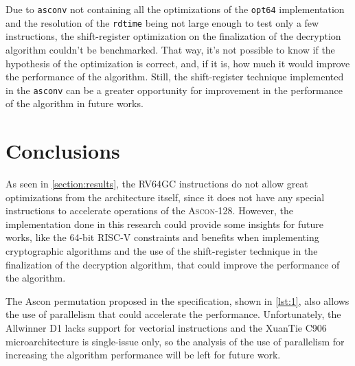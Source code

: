 \documentclass[11pt,twoside]{article}
\begin{document}
Due to \texttt{asconv} not containing all the optimizations of the \texttt{opt64} implementation and the resolution of the \texttt{rdtime} being not large enough to test only a few instructions, the shift-register optimization on the finalization of the decryption algorithm couldn't be benchmarked. That way, it's not possible to know if the hypothesis of the optimization is correct, and, if it is, how much it would improve the performance of the algorithm. Still, the shift-register technique implemented in the \texttt{asconv} can be a greater opportunity for improvement in the performance of the algorithm in future works.

\section{Conclusions}

As seen in \cref{section:results}, the \textsf{RV64GC} instructions do not allow great optimizations from the architecture itself, since it does not have any special instructions to accelerate operations of the \textsc{Ascon-128}. However, the implementation done in this research could provide some insights for future works, like the 64-bit RISC-V constraints and benefits when implementing cryptographic algorithms and the use of the shift-register technique in the finalization of the decryption algorithm, that could improve the performance of the algorithm.

The Ascon permutation proposed in the specification, shown in \cref{lst:1}, also allows the use of parallelism that could accelerate the performance. Unfortunately, the Allwinner D1 lacks support for vectorial instructions and the XuanTie C906 microarchitecture is single-issue only, so the analysis of the use of parallelism for increasing the algorithm performance will be left for future work.
\end{document}
